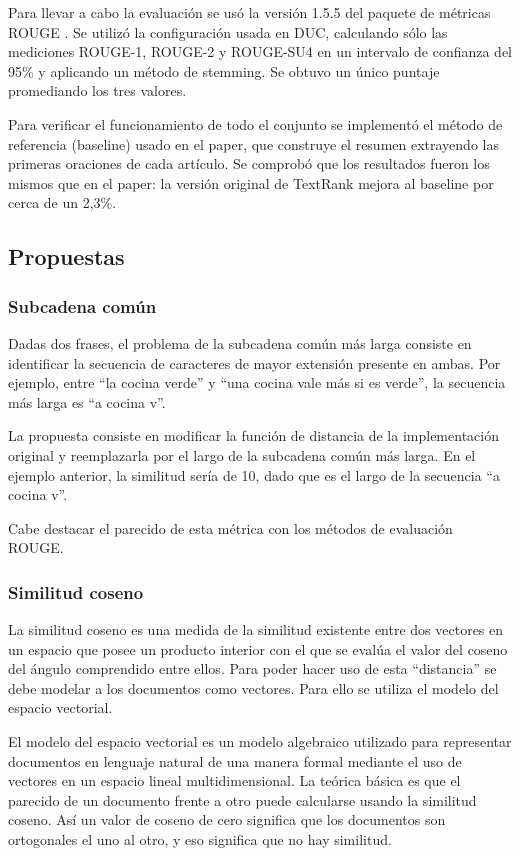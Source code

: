\documentclass{llncs}
\begin{document}
Para llevar a cabo la evaluación se usó la versión 1.5.5 del paquete de métricas ROUGE \cite{Lin2004a}. Se utilizó la configuración usada en DUC, calculando sólo las mediciones ROUGE-1, ROUGE-2 y ROUGE-SU4 en un intervalo de confianza del 95\% y aplicando un método de stemming. Se obtuvo un único puntaje promediando los tres valores.

Para verificar el funcionamiento de todo el conjunto se implementó el método de referencia (baseline) usado en el paper, que construye el resumen extrayendo las primeras oraciones de cada artículo. Se comprobó que los resultados fueron los mismos que en el paper: la versión original de TextRank mejora al baseline por cerca de un 2,3\%.

\subsection{Propuestas}

\subsubsection{Subcadena común}
Dadas dos frases, el problema de la subcadena común más larga consiste en identificar la secuencia de caracteres de mayor extensión presente en ambas. Por ejemplo, entre “la cocina verde” y “una cocina vale más si es verde”, la secuencia más larga es “a cocina v”.

La propuesta consiste en modificar la función de distancia de la implementación original y reemplazarla por el largo de la subcadena común más larga. En el ejemplo anterior, la similitud sería de 10, dado que es el largo de la secuencia “a cocina v”.

Cabe destacar el parecido de esta métrica con los métodos de evaluación ROUGE.


\subsubsection{Similitud coseno}
La similitud coseno es una medida de la similitud existente entre dos vectores en un espacio que posee un producto interior con el que se evalúa el valor del coseno del ángulo comprendido entre ellos. Para poder hacer uso de esta “distancia” se debe modelar a los documentos como vectores. Para ello se utiliza el modelo del espacio vectorial.

El modelo del espacio vectorial es un modelo algebraico utilizado para representar documentos en lenguaje natural de una manera formal mediante el uso de vectores en un espacio lineal multidimensional. La teórica básica es que el parecido de un documento frente a otro puede calcularse usando la similitud coseno. Así un valor de coseno de cero significa que los documentos son ortogonales el uno al otro, y eso significa que no hay similitud.
\end{document}
